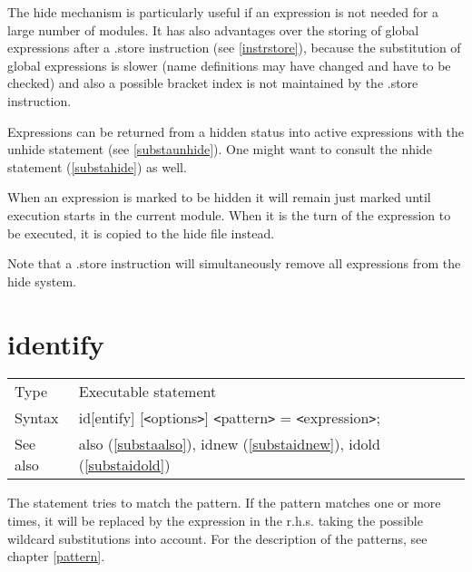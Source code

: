 \noindent The hide mechanism is particularly useful if an expression is not 
needed for a large number of modules. It has also advantages over the 
storing of global expressions after a .store instruction (see 
\ref{instrstore}), because the substitution of global expressions is slower 
(name definitions may have changed and have to be checked) and also a 
possible bracket index is not maintained by the .store instruction. 
\vspace{4mm}

\noindent Expressions can be returned from a hidden status into active 
expressions with the unhide statement (see 
\ref{substaunhide}). One might want to consult the nhide 
statement (\ref{substahide}) as well. \vspace{4mm}

\noindent When an expression is marked to be hidden it will remain just 
marked until execution starts in the current module. When it is the turn of 
the expression to be executed, it is copied to the hide file instead. 
\vspace{4mm}

\noindent Note that a .store instruction will simultaneously remove all 
expressions from the hide system. \vspace{10mm}


\section{identify}
\label{substaidentify}

\noindent \begin{tabular}{ll}
Type & Executable statement\\
Syntax & id[entify] [{\tt<}options{\tt>}] {\tt<}pattern{\tt>} = {\tt<}expression{\tt>};
\\ See also & also (\ref{substaalso}),
              idnew (\ref{substaidnew}),
              idold (\ref{substaidold})
\end{tabular}\vspace{4mm}

\noindent The statement tries to match the 
pattern. If the pattern matches one or more times, it will 
be replaced by the expression in the r.h.s. taking the possible 
wildcard substitutions into account. For the description of 
the patterns, see chapter \ref{pattern}.

